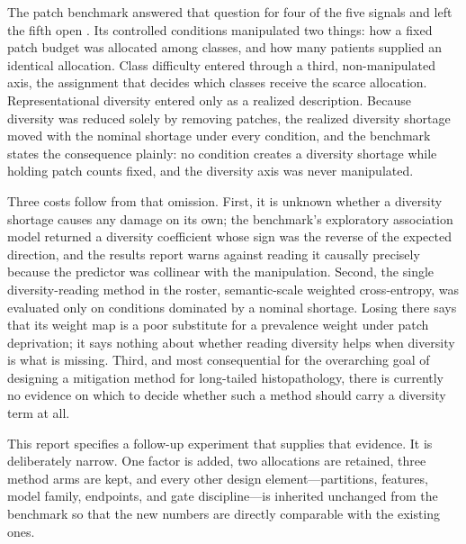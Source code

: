\documentclass[11pt]{article}
\begin{document}
The patch benchmark answered that question for four of the five signals and left the fifth open \citep{queisler2026benchmarkProtocol,queisler2026benchmarkResults}. Its controlled conditions manipulated two things: how a fixed patch budget was allocated among classes, and how many patients supplied an identical allocation. Class difficulty entered through a third, non-manipulated axis, the assignment that decides which classes receive the scarce allocation. Representational diversity entered only as a realized description. Because diversity was reduced solely by removing patches, the realized diversity shortage moved with the nominal shortage under every condition, and the benchmark states the consequence plainly: no condition creates a diversity shortage while holding patch counts fixed, and the diversity axis was never manipulated.

Three costs follow from that omission. First, it is unknown whether a diversity shortage causes any damage on its own; the benchmark's exploratory association model returned a diversity coefficient whose sign was the reverse of the expected direction, and the results report warns against reading it causally precisely because the predictor was collinear with the manipulation. Second, the single diversity-reading method in the roster, semantic-scale weighted cross-entropy, was evaluated only on conditions dominated by a nominal shortage. Losing there says that its weight map is a poor substitute for a prevalence weight under patch deprivation; it says nothing about whether reading diversity helps when diversity is what is missing. Third, and most consequential for the overarching goal of designing a mitigation method for long-tailed histopathology, there is currently no evidence on which to decide whether such a method should carry a diversity term at all.

This report specifies a follow-up experiment that supplies that evidence. It is deliberately narrow. One factor is added, two allocations are retained, three method arms are kept, and every other design element---partitions, features, model family, endpoints, and gate discipline---is inherited unchanged from the benchmark so that the new numbers are directly comparable with the existing ones.
\end{document}
